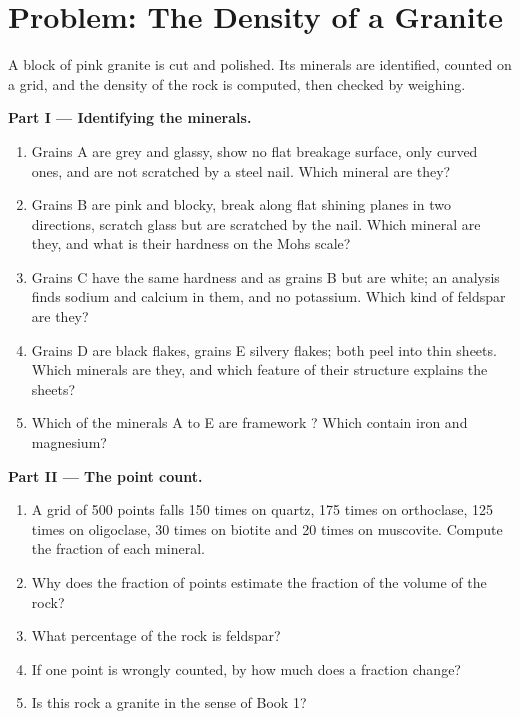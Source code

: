 \section{Problem: The Density of a Granite}

\begin{problem}
\label{pb:g11:minerals:1}
A block of pink granite is cut and polished. Its minerals are identified,
counted on a grid, and the density of the rock is computed, then checked by
weighing.

\medskip
\noindent\textbf{Part I --- Identifying the minerals.}
\begin{enumerate}
  \item Grains A are grey and glassy, show no flat breakage surface, only
        curved ones, and are not scratched by a steel nail. Which mineral
        are they?
  \item Grains B are pink and blocky, break along flat shining planes in
        two directions, scratch glass but are scratched by the nail. Which
        mineral are they, and what is their hardness on the Mohs scale?
  \item Grains C have the same hardness and  as grains B but are
        white; an analysis finds sodium and calcium in them, and no
        potassium. Which kind of feldspar are they?
  \item Grains D are black flakes, grains E silvery flakes; both peel into
        thin sheets. Which minerals are they, and which feature of their
        structure explains the sheets?
  \item Which of the minerals A to E are framework ? Which contain
        iron and magnesium?
\end{enumerate}

\medskip
\noindent\textbf{Part II --- The point count.}
\begin{enumerate}[resume]
  \item A grid of 500 points falls 150 times on quartz, 175 times on
        orthoclase, 125 times on oligoclase, 30 times on biotite and 20 times
        on muscovite. Compute the fraction of each mineral.
  \item Why does the fraction of points estimate the fraction of the volume
        of the rock?
  \item What percentage of the rock is feldspar?
  \item If one point is wrongly counted, by how much does a fraction change?
  \item Is this rock a granite in the sense of Book 1?
\end{enumerate}


\end{problem}
